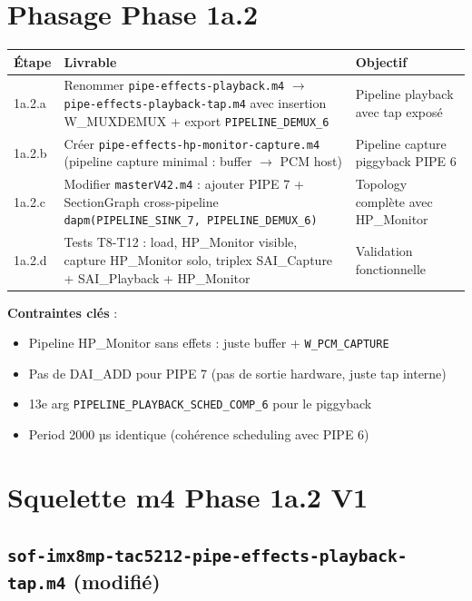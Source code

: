 \documentclass[11pt,a4paper]{article}
\begin{document}
\section{Phasage Phase 1a.2}

\begin{center}
\begin{tabularx}{\textwidth}{llX}
\toprule
\textbf{Étape} & \textbf{Livrable} & \textbf{Objectif} \\
\midrule
1a.2.a & Renommer \texttt{pipe-effects-playback.m4} $\to$ \texttt{pipe-effects-playback-tap.m4} avec insertion W\_MUXDEMUX + export \texttt{PIPELINE\_DEMUX\_6} & Pipeline playback avec tap exposé \\
1a.2.b & Créer \texttt{pipe-effects-hp-monitor-capture.m4} (pipeline capture minimal : buffer $\to$ PCM host) & Pipeline capture piggyback PIPE 6 \\
1a.2.c & Modifier \texttt{masterV42.m4} : ajouter PIPE 7 + SectionGraph cross-pipeline \texttt{dapm(PIPELINE\_SINK\_7, PIPELINE\_DEMUX\_6)} & Topology complète avec HP\_Monitor \\
1a.2.d & Tests T8-T12 : load, HP\_Monitor visible, capture HP\_Monitor solo, triplex SAI\_Capture + SAI\_Playback + HP\_Monitor & Validation fonctionnelle \\
\bottomrule
\end{tabularx}
\end{center}

\textbf{Contraintes clés} :
\begin{itemize}[leftmargin=*, itemsep=1pt]
  \item Pipeline HP\_Monitor sans effets : juste buffer + \texttt{W\_PCM\_CAPTURE}
  \item Pas de DAI\_ADD pour PIPE 7 (pas de sortie hardware, juste tap interne)
  \item 13e arg \texttt{PIPELINE\_PLAYBACK\_SCHED\_COMP\_6} pour le piggyback
  \item Period 2000 µs identique (cohérence scheduling avec PIPE 6)
\end{itemize}

\section{Squelette m4 Phase 1a.2 V1}

\subsection{\texttt{sof-imx8mp-tac5212-pipe-effects-playback-tap.m4} (modifié)}
\end{document}
